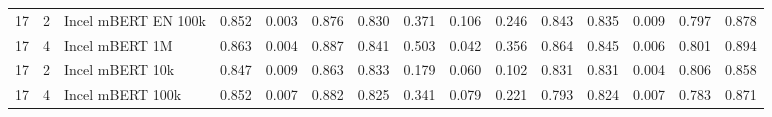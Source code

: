 \begin{tabular}{rrlrrrrrrrrrrrr}
 17 &      2 & Incel mBERT EN 100k &                 0.852 &          0.003 &                  0.876 &                   0.830 &                 0.371 &           0.106 &                  0.246 &                   0.843 &                  0.835 &               0.009 &                    0.797 &                   0.878 \\
 17 &      4 &      Incel mBERT 1M &                 0.863 &          0.004 &                  0.887 &                   0.841 &                 0.503 &           0.042 &                  0.356 &                   0.864 &                  0.845 &               0.006 &                    0.801 &                   0.894 \\
 17 &      2 &     Incel mBERT 10k &                 0.847 &          0.009 &                  0.863 &                   0.833 &                 0.179 &           0.060 &                  0.102 &                   0.831 &                  0.831 &               0.004 &                    0.806 &                   0.858 \\
 17 &      4 &    Incel mBERT 100k &                 0.852 &          0.007 &                  0.882 &                   0.825 &                 0.341 &           0.079 &                  0.221 &                   0.793 &                  0.824 &               0.007 &                    0.783 &                   0.871 \\
\bottomrule
\end{tabular}
